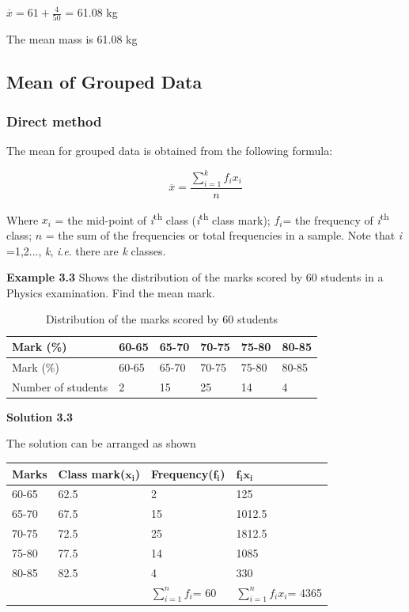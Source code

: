 \documentclass[
]{book}
\begin{document}
\(\overline{x} = 61 + \frac{4}{50}\) = 61.08 kg

The mean mass is 61.08 kg

\hypertarget{mean-of-grouped-data}{%
\subsection{Mean of Grouped Data}\label{mean-of-grouped-data}}

\hypertarget{direct-method-1}{%
\subsubsection{Direct method}\label{direct-method-1}}

The mean for grouped data is obtained from the following formula:

\[\overline{x} = \frac{\sum_{i = 1}^{k}{f_{i}x_{i}}}{n}\]

Where \(x_{i}\) = the mid-point of \emph{i}\textsuperscript{th} class (\emph{i}\textsuperscript{th} class mark);
\(f_{i}\)= the frequency of \emph{i}\textsuperscript{th} class; \(n\) = the sum of the
frequencies or total frequencies in a sample. Note that \emph{i} =1,2...,
\emph{k}, \emph{i}.\emph{e}. there are \emph{k} classes.

\textbf{Example 3.3} Shows the distribution of the marks scored by 60 students in a Physics examination. Find the mean mark.

\begin{longtable}[]{@{}llllll@{}}
\caption{\label{tab:phy} Distribution of the marks scored by 60 students}\tabularnewline
\toprule
Mark (\%) & 60-65 & 65-70 & 70-75 & 75-80 & 80-85 \\
\midrule
\endfirsthead
\toprule
Mark (\%) & 60-65 & 65-70 & 70-75 & 75-80 & 80-85 \\
\midrule
\endhead
Number of students & 2 & 15 & 25 & 14 & 4 \\
\bottomrule
\end{longtable}

\textbf{Solution 3.3}

The solution can be arranged as shown

\begin{longtable}[]{@{}llll@{}}
\toprule
Marks & Class mark(\(\mathbf{x}_{\mathbf{i}}\)) & Frequency(\(\mathbf{f}_{\mathbf{i}}\)) & \(\mathbf{f}_{\mathbf{i}}\mathbf{x}_{\mathbf{i}}\) \\
\midrule
\endhead
60-65 & 62.5 & 2 & 125 \\
65-70 & 67.5 & 15 & 1012.5 \\
70-75 & 72.5 & 25 & 1812.5 \\
75-80 & 77.5 & 14 & 1085 \\
80-85 & 82.5 & 4 & 330 \\
& & \(\sum_{i = 1}^{n}f_{i}\)= 60 & \(\sum_{i = 1}^{n}{f_{i}x_{i}}\)= 4365 \\
\bottomrule
\end{longtable}
\end{document}
